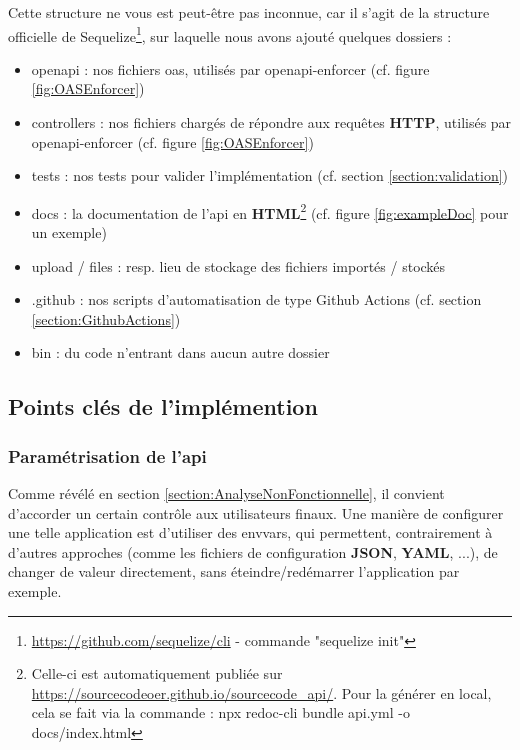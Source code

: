 Cette structure ne vous est peut-être pas inconnue, car il s'agit de la structure officielle de Sequelize\footnote{
    \url{https://github.com/sequelize/cli} - commande "sequelize init"
}, sur laquelle nous avons ajouté quelques dossiers :

\begin{itemize}
    \item openapi : nos fichiers \Gls{oas}, utilisés par openapi-enforcer (cf. figure \ref{fig:OASEnforcer})
    \item controllers : nos fichiers chargés de répondre aux requêtes \textbf{HTTP}, utilisés par openapi-enforcer (cf. figure \ref{fig:OASEnforcer})
    \item tests : nos tests pour valider l'implémentation (cf. section \ref{section:validation})
    \item docs : la documentation de l'\Gls{api} en \textbf{HTML}\footnote{
        Celle-ci est automatiquement publiée sur 
        \href{https://sourcecodeoer.github.io/sourcecode\_api/}{https://sourcecodeoer.github.io/sourcecode\_api/}.
        Pour la générer en local, cela se fait via la commande : 
        npx redoc-cli bundle api.yml -o docs/index.html 
    } (cf. figure \ref{fig:exampleDoc} pour un exemple)
    \item upload / files : resp. lieu de stockage des fichiers importés / stockés 
    \item .github : nos scripts d'automatisation de type Github Actions (cf. section \ref{section:GithubActions}) 
    \item bin : du code n'entrant dans aucun autre dossier
\end{itemize}

\pagebreak
\subsection{Points clés de l'implémention}

\subsubsection{Paramétrisation de l'\Gls{api}}

Comme révélé en section \ref{section:AnalyseNonFonctionnelle}, il convient d'accorder un certain contrôle aux utilisateurs finaux.
Une manière de configurer une telle application est d'utiliser des \glspl{envvar}, 
qui permettent, contrairement à d'autres approches (comme les fichiers de configuration \textbf{JSON}, \textbf{YAML}, ...), 
de changer de valeur directement, sans éteindre/redémarrer l'application par exemple. \\

